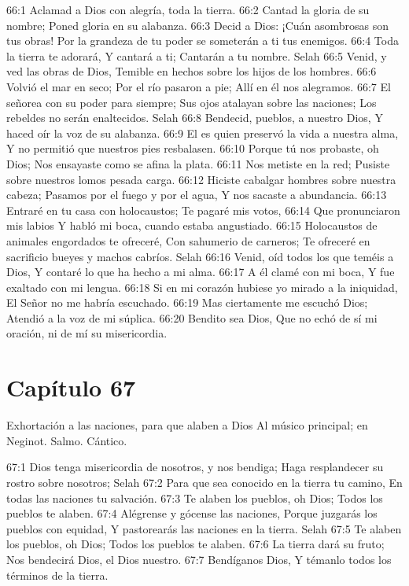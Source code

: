 66:1 Aclamad a Dios con alegría, toda la tierra. 
66:2 Cantad la gloria de su nombre; 
Poned gloria en su alabanza. 
66:3 Decid a Dios: ¡Cuán asombrosas son tus obras! 
Por la grandeza de tu poder se someterán a ti tus enemigos. 
66:4 Toda la tierra te adorará, 
Y cantará a ti; 
Cantarán a tu nombre. Selah 
66:5 Venid, y ved las obras de Dios, 
Temible en hechos sobre los hijos de los hombres. 
66:6 Volvió el mar en seco; 
Por el río pasaron a pie; 
Allí en él nos alegramos. 
66:7 El señorea con su poder para siempre; 
Sus ojos atalayan sobre las naciones; 
Los rebeldes no serán enaltecidos. Selah 
66:8 Bendecid, pueblos, a nuestro Dios, 
Y haced oír la voz de su alabanza. 
66:9 El es quien preservó la vida a nuestra alma, 
Y no permitió que nuestros pies resbalasen. 
66:10 Porque tú nos probaste, oh Dios; 
Nos ensayaste como se afina la plata. 
66:11 Nos metiste en la red; 
Pusiste sobre nuestros lomos pesada carga. 
66:12 Hiciste cabalgar hombres sobre nuestra cabeza; 
Pasamos por el fuego y por el agua, 
Y nos sacaste a abundancia. 
66:13 Entraré en tu casa con holocaustos; 
Te pagaré mis votos, 
66:14 Que pronunciaron mis labios 
Y habló mi boca, cuando estaba angustiado. 
66:15 Holocaustos de animales engordados te ofreceré, 
Con sahumerio de carneros; 
Te ofreceré en sacrificio bueyes y machos cabríos. Selah 
66:16 Venid, oíd todos los que teméis a Dios, 
Y contaré lo que ha hecho a mi alma. 
66:17 A él clamé con mi boca, 
Y fue exaltado con mi lengua. 
66:18 Si en mi corazón hubiese yo mirado a la iniquidad, 
El Señor no me habría escuchado. 
66:19 Mas ciertamente me escuchó Dios; 
Atendió a la voz de mi súplica. 
66:20 Bendito sea Dios, 
Que no echó de sí mi oración, ni de mí su misericordia. 
\section*{Capítulo 67}
Exhortación a las naciones, para que alaben a Dios 
Al músico principal; en Neginot. Salmo. Cántico. 
 
67:1 Dios tenga misericordia de nosotros, y nos bendiga; 
Haga resplandecer su rostro sobre nosotros; Selah 
67:2 Para que sea conocido en la tierra tu camino, 
En todas las naciones tu salvación. 
67:3 Te alaben los pueblos, oh Dios; 
Todos los pueblos te alaben. 
67:4 Alégrense y gócense las naciones, 
Porque juzgarás los pueblos con equidad, 
Y pastorearás las naciones en la tierra. Selah 
67:5 Te alaben los pueblos, oh Dios; 
Todos los pueblos te alaben. 
67:6 La tierra dará su fruto; 
Nos bendecirá Dios, el Dios nuestro. 
67:7 Bendíganos Dios, 
Y témanlo todos los términos de la tierra. 

